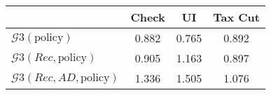 \begin{tabular}{@{}lccc@{}} 
\toprule 
                          & Check      & UI    & Tax Cut    \\  \midrule 
$\mathcal{G}3(\text{policy})$ & 0.882  & 0.765  & 0.892     \\ 
$\mathcal{G}3(Rec,\text{policy})$ & 0.905  & 1.163  & 0.897     \\ 
$\mathcal{G}3(Rec, AD,\text{policy})$ & 1.336  & 1.505  & 1.076     \\ 
\end{tabular}  
